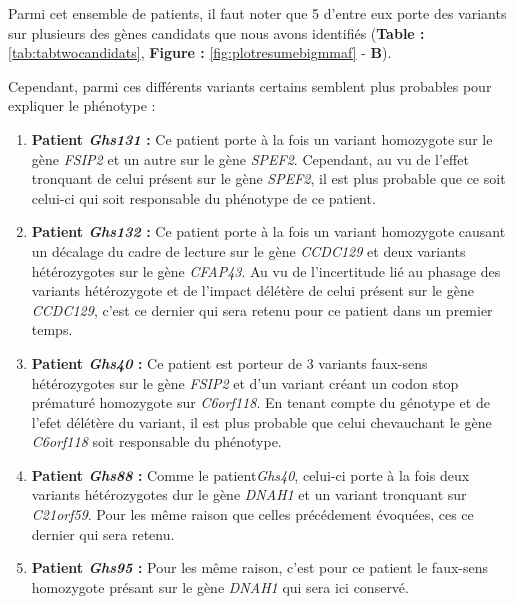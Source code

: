\documentclass[12pt,twoside]{reedthesis}
\providecommand{\tightlist}{%
  \setlength{\itemsep}{0pt}\setlength{\parskip}{0pt}}
\theoremstyle{definition}
\theoremstyle{definition}
\theoremstyle{remark}
\begin{document}
  Parmi cet ensemble de patients, il faut noter que 5 d'entre eux porte
  des variants sur plusieurs des gènes candidats que nous avons identifiés
  (\textbf{Table :} \ref{tab:tabtwocandidats}, \textbf{Figure :
  }\ref{fig:plotresumebigmmaf} - \textbf{B}).
  
  Cependant, parmi ces différents variants certains semblent plus
  probables pour expliquer le phénotype :
  
  \begin{enumerate}
  \def\labelenumi{\arabic{enumi}.}
  \tightlist
  \item
    \textbf{Patient \emph{Ghs131} :} Ce patient porte à la fois un variant
    homozygote sur le gène \emph{FSIP2} et un autre sur le gène
    \emph{SPEF2}. Cependant, au vu de l'effet tronquant de celui présent
    sur le gène \emph{SPEF2}, il est plus probable que ce soit celui-ci
    qui soit responsable du phénotype de ce patient.\\
  \item
    \textbf{Patient \emph{Ghs132} :} Ce patient porte à la fois un variant
    homozygote causant un décalage du cadre de lecture sur le gène
    \emph{CCDC129} et deux variants hétérozygotes sur le gène
    \emph{CFAP43}. Au vu de l'incertitude lié au phasage des variants
    hétérozygote et de l'impact délétère de celui présent sur le gène
    \emph{CCDC129}, c'est ce dernier qui sera retenu pour ce patient dans
    un premier temps.\\
  \item
    \textbf{Patient \emph{Ghs40} :} Ce patient est porteur de 3 variants
    faux-sens hétérozygotes sur le gène \emph{FSIP2} et d'un variant
    créant un codon stop prématuré homozygote sur \emph{C6orf118}. En
    tenant compte du génotype et de l'efet délétère du variant, il est
    plus probable que celui chevauchant le gène \emph{C6orf118} soit
    responsable du phénotype.\\
  \item
    \textbf{Patient \emph{Ghs88} :} Comme le patient\emph{Ghs40}, celui-ci
    porte à la fois deux variants hétérozygotes dur le gène \emph{DNAH1}
    et un variant tronquant sur \emph{C21orf59}. Pour les même raison que
    celles précédement évoquées, ces ce dernier qui sera retenu.\\
  \item
    \textbf{Patient \emph{Ghs95} :} Pour les même raison, c'est pour ce
    patient le faux-sens homozygote présant sur le gène \emph{DNAH1} qui
    sera ici conservé.
  \end{enumerate}
  
\end{document}
